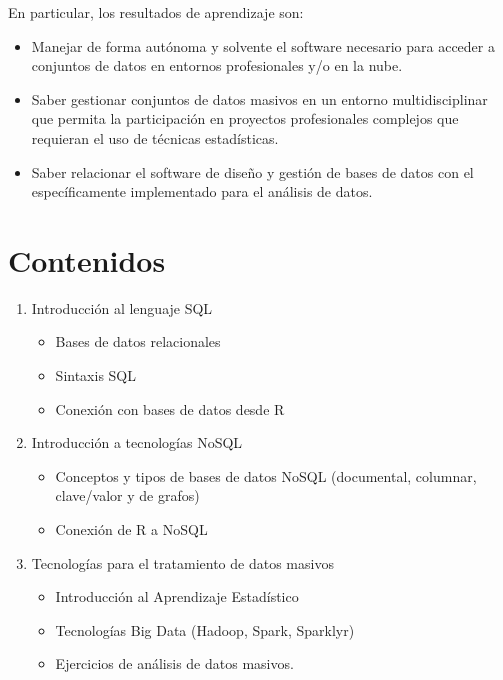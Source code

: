 \documentclass[
]{book}
\providecommand{\tightlist}{%
  \setlength{\itemsep}{0pt}\setlength{\parskip}{0pt}}
\begin{document}
En particular, los resultados de aprendizaje son:

\begin{itemize}
\item
  Manejar de forma autónoma y solvente el software necesario para acceder a conjuntos de datos en entornos profesionales y/o en la nube.
\item
  Saber gestionar conjuntos de datos masivos en un entorno multidisciplinar que permita la participación en proyectos profesionales complejos que requieran el uso de técnicas estadísticas.
\item
  Saber relacionar el software de diseño y gestión de bases de datos con el específicamente implementado para el análisis de datos.
\end{itemize}

\hypertarget{contenidos}{%
\section{Contenidos}\label{contenidos}}

\begin{enumerate}
\def\labelenumi{\arabic{enumi}.}
\tightlist
\item
  Introducción al lenguaje SQL

  \begin{itemize}
  \tightlist
  \item
    Bases de datos relacionales
  \item
    Sintaxis SQL
  \item
    Conexión con bases de datos desde R
  \end{itemize}
\item
  Introducción a tecnologías NoSQL

  \begin{itemize}
  \tightlist
  \item
    Conceptos y tipos de bases de datos NoSQL (documental, columnar, clave/valor y de grafos)
  \item
    Conexión de R a NoSQL
  \end{itemize}
\item
  Tecnologías para el tratamiento de datos masivos

  \begin{itemize}
  \tightlist
  \item
    Introducción al Aprendizaje Estadístico
  \item
    Tecnologías Big Data (Hadoop, Spark, Sparklyr)
  \item
    Ejercicios de análisis de datos masivos.
  \end{itemize}
\end{enumerate}
\end{document}
